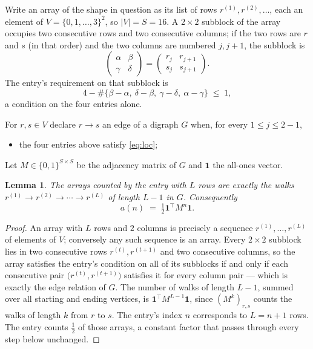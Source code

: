 \documentclass[11pt,a4paper]{article}
\theoremstyle{plain}
\newtheorem{lemma}[theorem]{Lemma}
\theoremstyle{definition}
\begin{document}
Write an array of the shape in question as its list of rows
$r^{(1)},r^{(2)},\dots$, each an element of
$V=\{0,1,\dots,3\}^{2}$, so $|V|=S=16$. A $2\times2$ subblock of the array
occupies two consecutive rows and two consecutive columns; if the two rows are $r$
and $s$ (in that order) and the two columns are numbered $j,j+1$,
the subblock is
\[
\begin{pmatrix}\alpha&\beta\\\gamma&\delta\end{pmatrix}=\begin{pmatrix}r_j&r_{j+1}\\s_j&s_{j+1}\end{pmatrix}.
\]
The entry's requirement on that subblock is
\begin{equation}\label{eq:loc}
4-\#\{\beta-\alpha,\ \delta-\beta,\ \gamma-\delta,\ \alpha-\gamma\}\;\le\;1,
\end{equation}
a condition on the four entries alone.

For $r,s\in V$ declare $r\to s$ an edge of a digraph $G$ when, for every
$1\le j\le 2-1$,
\begin{itemize}
\item the four entries above satisfy \eqref{eq:loc};

\end{itemize}
Let $M\in\{0,1\}^{S\times S}$ be the adjacency matrix of $G$ and $\mathbf{1}$ the
all-ones vector.

\begin{lemma}\label{lem:walk}
The arrays counted by the entry with $L$ rows are exactly the walks
$r^{(1)}\to r^{(2)}\to\cdots\to r^{(L)}$ of length $L-1$ in $G$. Consequently
\[
a(n)\;=\;\tfrac1{2}\mathbf{1}^{\!\top}M^{n}\mathbf{1} .
\]
\end{lemma}

\begin{proof}
An array with $L$ rows and $2$ columns is precisely a sequence
$r^{(1)},\dots,r^{(L)}$ of elements of $V$; conversely any such sequence is an array.
Every $2\times2$ subblock lies in two consecutive rows $r^{(t)},r^{(t+1)}$ and two
consecutive columns, so the array satisfies the entry's condition on all of its subblocks
if and only if each consecutive pair $\bigl(r^{(t)},r^{(t+1)}\bigr)$ satisfies it for
every column pair --- which is exactly the edge relation of $G$. The number of walks of
length $L-1$, summed over all starting and ending vertices, is
$\mathbf{1}^{\!\top}M^{L-1}\mathbf{1}$, since $(M^{k})_{r,s}$ counts the walks of
length $k$ from $r$ to $s$. The entry's index $n$ corresponds to $L=n+1$ rows. The entry counts $\tfrac1{2}$ of those arrays, a constant factor that passes through every step below unchanged.
\end{proof}
\end{document}
